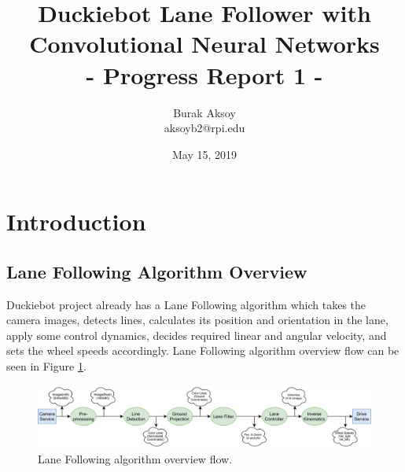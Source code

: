 \documentclass[11pt,letterpaper]{article}
\begin{document}
	
	\setlength{\droptitle}{-1in} %
	\pretitle{\begin{center}\LARGE}
		\title{Duckiebot Lane Follower with Convolutional Neural Networks\\- Progress Report 1 -}
		\posttitle{\par\end{center}}
	\preauthor{\begin{center}}
		\author{{\Large Burak Aksoy}\\
			aksoyb2@rpi.edu}
		\postauthor{\par\end{center}}
	
	\date{May 15, 2019} 

	\maketitle
	
	\noindent\makebox[\linewidth]{\rule{\linewidth}{2pt}}
	
	\tableofcontents
	
	\section{Introduction}
	\subsection{Lane Following Algorithm Overview}
	Duckiebot project already has a Lane Following algorithm which takes the camera images, detects lines, calculates its position and orientation in the lane, apply some control dynamics, decides required linear and angular velocity, and sets the wheel speeds accordingly. Lane Following algorithm overview flow can be seen in Figure \ref{fig:01}. 
	
	\begin{figure}[h!]
		\centering
		\includegraphics[width=1.0\linewidth]{algo0.png}
		\caption{Lane Following algorithm overview flow.}
		\label{fig:01}
	\end{figure}
	
\end{document}
